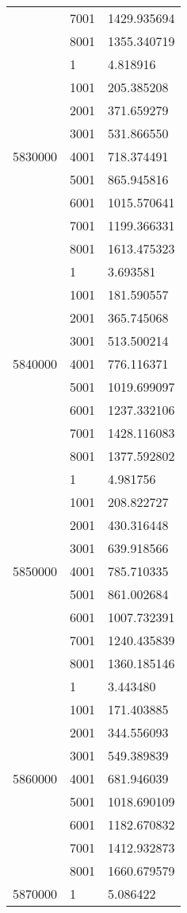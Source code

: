 \begin{table}[htb!]
\begin{tabular}{lll}
 & 7001 & 1429.935694 \\
 & 8001 & 1355.340719 \\
\multirow[c]{9}{*}{5830000} & 1 & 4.818916 \\
 & 1001 & 205.385208 \\
 & 2001 & 371.659279 \\
 & 3001 & 531.866550 \\
 & 4001 & 718.374491 \\
 & 5001 & 865.945816 \\
 & 6001 & 1015.570641 \\
 & 7001 & 1199.366331 \\
 & 8001 & 1613.475323 \\
\multirow[c]{9}{*}{5840000} & 1 & 3.693581 \\
 & 1001 & 181.590557 \\
 & 2001 & 365.745068 \\
 & 3001 & 513.500214 \\
 & 4001 & 776.116371 \\
 & 5001 & 1019.699097 \\
 & 6001 & 1237.332106 \\
 & 7001 & 1428.116083 \\
 & 8001 & 1377.592802 \\
\multirow[c]{9}{*}{5850000} & 1 & 4.981756 \\
 & 1001 & 208.822727 \\
 & 2001 & 430.316448 \\
 & 3001 & 639.918566 \\
 & 4001 & 785.710335 \\
 & 5001 & 861.002684 \\
 & 6001 & 1007.732391 \\
 & 7001 & 1240.435839 \\
 & 8001 & 1360.185146 \\
\multirow[c]{9}{*}{5860000} & 1 & 3.443480 \\
 & 1001 & 171.403885 \\
 & 2001 & 344.556093 \\
 & 3001 & 549.389839 \\
 & 4001 & 681.946039 \\
 & 5001 & 1018.690109 \\
 & 6001 & 1182.670832 \\
 & 7001 & 1412.932873 \\
 & 8001 & 1660.679579 \\
\multirow[c]{9}{*}{5870000} & 1 & 5.086422 \\

\end{tabular}
\end{table}
